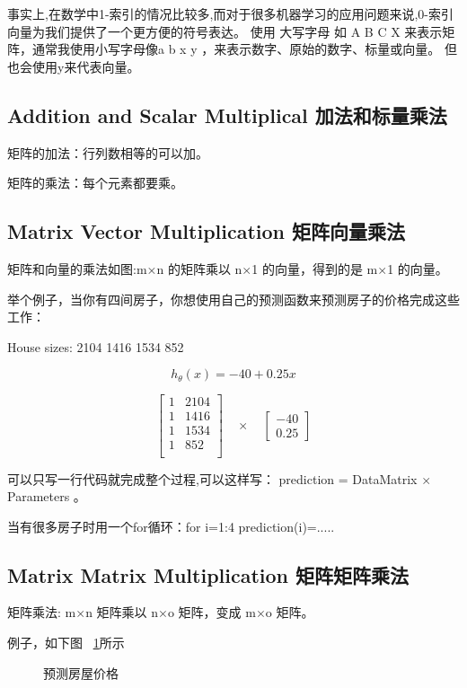 \documentclass[UTF8]{ctexart}
\begin{document}
事实上,在数学中1-索引的情况比较多,而对于很多机器学习的应用问题来说,0-索引向量为我们提供了一个更方便的符号表达。
使用 大写字母 如 A B C X 来表示矩阵，通常我使用小写字母像a b x y ，来表示数字、原始的数字、标量或向量。
但也会使用y来代表向量。

\subsection{Addition and Scalar Multiplical 加法和标量乘法}
矩阵的加法：行列数相等的可以加。

矩阵的乘法：每个元素都要乘。
\subsection{Matrix Vector Multiplication 矩阵向量乘法}

矩阵和向量的乘法如图:m×n 的矩阵乘以 n$\times$1 的向量，得到的是 m$\times$1 的向量。

举个例子，当你有四间房子，你想使用自己的预测函数来预测房子的价格完成这些工作：

House sizes: 2104 1416 1534 852

\begin{equation*}
h_\theta(x)=-40+0.25x
\end{equation*}

\begin{equation*}
  \begin{bmatrix}
    1 &  2104 \\
    1 &  1416  \\
    1 &  1534 \\
    1 &  852 \\
  \end{bmatrix} \quad \times \quad
  \begin{bmatrix}
     -40 \\
     0.25
  \end{bmatrix}
\end{equation*}

可以只写一行代码就完成整个过程,可以这样写： prediction = DataMatrix $\times$ Parameters 。

当有很多房子时用一个for循环：for i=1:4  prediction(i)=.....
\subsection{Matrix Matrix Multiplication 矩阵矩阵乘法}
矩阵乘法: m$\times$n 矩阵乘以 n$\times$o 矩阵，变成 m$\times$o 矩阵。

例子，如下图 ~\ref{fig:8}所示
\begin{figure}[htb]
 \caption{预测房屋价格}
 \label{fig:8}
\end{figure}
\end{document}
